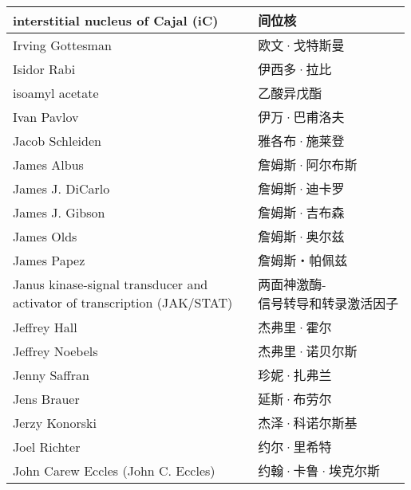 \begin{longtable}{lll}
	\midrule
	interstitial nucleus of Cajal (iC)   && 间位核  \\
	
	\midrule
	Irving Gottesman   && 欧文·戈特斯曼  \\
	
	\midrule
	Isidor Rabi   && 伊西多·拉比  \\
	
	\midrule
	isoamyl acetate   && 乙酸异戊酯  \\
	
	\midrule
	Ivan Pavlov   && 伊万·巴甫洛夫  \\
	
	\midrule
	Jacob Schleiden   && 雅各布·施莱登  \\
	
	\midrule
	James Albus   && 詹姆斯·阿尔布斯  \\
	
	\midrule
	James J. DiCarlo   && 詹姆斯·迪卡罗  \\
	
	\midrule
	James J. Gibson   && 詹姆斯·吉布森  \\
	
	\midrule
	James Olds   && 詹姆斯·奥尔兹  \\
	
	\midrule
	James Papez   && 詹姆斯‧帕佩兹  \\
	
	\midrule
	\makecell{Janus kinase-signal transducer and \\activator of transcription (JAK/STAT)}  && \makecell{两面神激酶-\\信号转导和转录激活因子}  \\
	
	\midrule
	Jeffrey Hall   && 杰弗里·霍尔  \\
	
	\midrule
	Jeffrey Noebels   && 杰弗里·诺贝尔斯  \\
	
	\midrule
	Jenny Saffran   && 珍妮·扎弗兰  \\
	
	\midrule
	Jens Brauer   && 延斯·布劳尔  \\
	
	\midrule
	Jerzy Konorski   && 杰泽·科诺尔斯基  \\
	
	\midrule
	Joel Richter   && 约尔·里希特  \\
	
	\midrule
	John Carew Eccles (John C. Eccles)   && 约翰·卡鲁·埃克尔斯  \\
	

\end{longtable}
